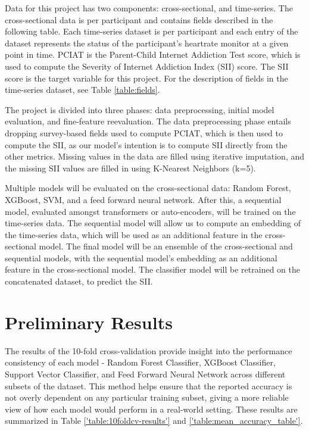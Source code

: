 \documentclass[11pt]{extarticle}
\begin{document}
Data for this project has two components: cross-sectional, and time-series. The cross-sectional data is per participant and contains fields described in the following table.
Each time-series dataset is per participant and each entry of the dataset represents the status of the participant's heartrate monitor at a given point in time. PCIAT is the Parent-Child Internet Addiction Test score, which is used to compute the Severity of Internet Addiction Index (SII) score. The SII score is the target variable for this project. For the description of fields in the time-series dataset, see Table \ref{table:fields}.

The project is divided into three phases: data preprocessing, initial model evaluation, and fine-feature reevaluation.
The data preprocessing phase entails dropping survey-based fields used to compute PCIAT, which is then used to compute the SII, as our model's intention is to compute SII directly from the other metrics.
Missing values in the data are filled using iterative imputation, and the missing SII values are filled in using K-Nearest Neighbors (k=5).

Multiple models will be evaluated on the cross-sectional data: Random Forest, XGBoost, SVM, and a feed forward neural network. After this, a sequential model, evaluated amongst transformers or auto-encoders, will be trained on the time-series data. The sequential model will allow us to compute an embedding of the time-series data, which will be used as an additional feature in the cross-sectional model.
The final model will be an ensemble of the cross-sectional and sequential models, with the sequential model's embedding as an additional feature in the cross-sectional model. The classifier model will be retrained on the concatenated dataset, to predict the SII.

\section{Preliminary Results} 
The results of the 10-fold cross-validation provide insight into the performance consistency of each model - Random Forest Classifier, XGBoost Classifier, Support Vector Classifier, and Feed Forward Neural Network across different subsets of the dataset. 
This method helps ensure that the reported accuracy is not overly dependent on any particular training subset, giving a more reliable view of how each model would perform in a real-world setting. 
These results are summarized in Table \ref*{'table:10foldcv-results'} and \ref{'table:mean_accuracy_table'}.
\end{document}
